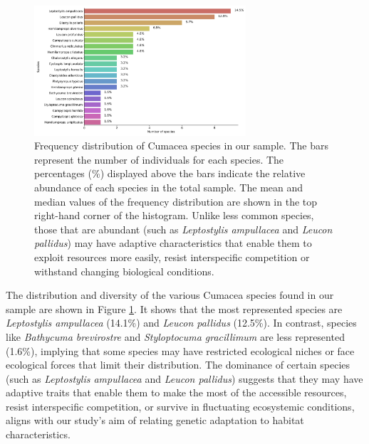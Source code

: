 {\begin{figure}[htbp]
    \centering
    \includegraphics[width=0.7\textwidth]{figure2.jpg}
    \caption{Frequency distribution of Cumacea species in our sample. The bars represent the number of individuals for each species. The percentages (\%) displayed above the bars indicate the relative abundance of each species in the total sample. The mean and median values of the frequency distribution are shown in the top right-hand corner of the histogram. Unlike less common species, those that are abundant (such as \emph{Leptostylis ampullacea} and \emph{Leucon pallidus}) may have adaptive characteristics that enable them to exploit resources more easily, resist interspecific competition or withstand changing biological conditions. \label{fig:fig3}}
\end{figure}

The distribution and diversity of the various Cumacea species found in our sample are shown in Figure \ref{fig:fig3}. It shows that the most represented species are \emph{Leptostylis ampullacea} (14.1\%) and \emph{Leucon pallidus} (12.5\%). In contrast, species like \emph{Bathycuma brevirostre} and \emph{Styloptocuma gracillimum} are less represented (1.6\%), implying that some species may have restricted ecological niches or face ecological forces that limit their distribution. The dominance of certain species (such as \emph{Leptostylis ampullacea} and \emph{Leucon pallidus}) suggests that they may have adaptive traits that enable them to make the most of the accessible resources, resist interspecific competition, or survive in fluctuating ecosystemic conditions, aligns with our study’s aim of relating genetic adaptation to habitat characteristics. 

}
